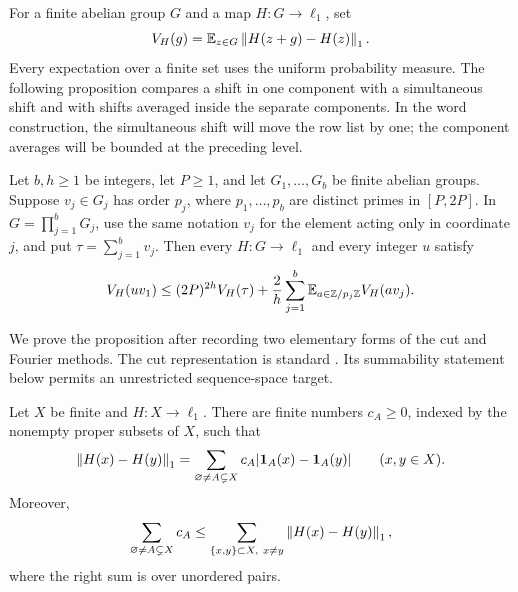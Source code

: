 For a finite abelian group $G$ and a map $H:G\to\ell_1$, set
\begin{equation}\label{eq:variation}
 V_H(g)=\mathbb E_{z\in G}\left\lVert H(z+g)-H(z)\right\rVert_1.
\end{equation}
Every expectation over a finite set uses the uniform probability measure.
The following proposition compares a shift in one component with a
simultaneous shift and with shifts averaged inside the separate
components. In the word construction, the simultaneous shift will move
the row list by one; the component averages will be bounded at the
preceding level.

\begin{proposition}
\label{prop:displacement}\label{fourier:displacement}
Let $b,h\ge1$ be integers, let $P\ge1$, and let $G_1,\ldots,G_b$ be finite
abelian groups. Suppose $v_j\in G_j$ has order $p_j$, where
$p_1,\ldots,p_b$ are distinct primes in $[P,2P]$. In
$G=\prod_{j=1}^bG_j$, use the same notation $v_j$ for the element acting
only in coordinate $j$, and put $\tau=\sum_{j=1}^b v_j$. Then every
$H:G\to\ell_1$ and every integer $u$ satisfy
\begin{equation}\label{eq:prime-product-bound}
 V_H(uv_1)
 \le (2P)^{2h}V_H(\tau)
 +\frac2h\sum_{j=1}^b\mathbb E_{a\in\mathbb Z/p_j\mathbb Z}V_H(av_j).
\end{equation}
\end{proposition}

We prove the proposition after recording two elementary forms of the
cut and Fourier methods. The cut representation is standard
\cite[Section~4]{LinialLondonRabinovich1995}. Its summability statement
below permits an unrestricted sequence-space target.

\begin{lemma}\label{lem:cuts}
Let $X$ be finite and $H:X\to\ell_1$. There are finite numbers $c_A\ge0$,
indexed by the nonempty proper subsets of $X$, such that
\begin{equation}\label{eq:cuts}
 \left\lVert H(x)-H(y)\right\rVert_1
 =\sum_{\varnothing\ne A\subsetneq X}
 c_A|\mathbf1_A(x)-\mathbf1_A(y)|
 \qquad(x,y\in X).
\end{equation}
Moreover,
\[
 \sum_{\varnothing\ne A\subsetneq X}c_A
 \le\sum_{\{x,y\}\subset X,\ x\ne y}\left\lVert H(x)-H(y)\right\rVert_1,
\]
where the right sum is over unordered pairs.
\end{lemma}

